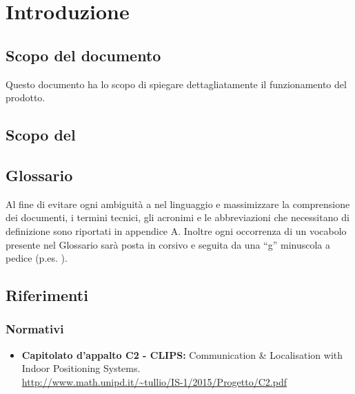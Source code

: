 \section{Introduzione}
\label{introduzione}
\subsection{Scopo del documento} 
Questo documento ha lo scopo di spiegare dettagliatamente il funzionamento del prodotto.
\subsection{Scopo del }
\SCOPO
\subsection{Glossario}
Al fine di evitare ogni ambiguità
a nel linguaggio e massimizzare la comprensione dei documenti,
i termini tecnici, gli acronimi e le abbreviazioni che necessitano di definizione sono riportati in appendice A.
Inoltre ogni occorrenza di un vocabolo presente nel Glossario sarà posta in corsivo e seguita da una ``g'' minuscola a pedice (p.es. ).

\subsection{Riferimenti}
\subsubsection{Normativi}
\begin{itemize}
	\item \textbf{Capitolato d'appalto C2 - CLIPS:} Communication \& Localisation with Indoor Positioning Systems. \\
	\url{http://www.math.unipd.it/~tullio/IS-1/2015/Progetto/C2.pdf}
\end{itemize}	
